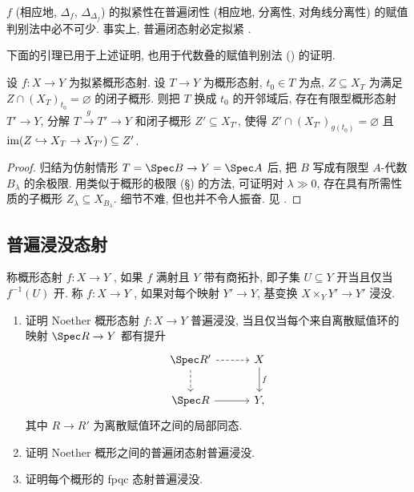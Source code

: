 \begin{remark}\label{src:A.4.7}
$f$ (相应地, $\Delta_f$, $\Delta_{\Delta_f}$) 的拟紧性在普遍闭性 (相应地, 分离性, 对角线分离性) 的赋值判别法中必不可少. 事实上, 普遍闭态射必定拟紧 \cite[Tag 04XU]{SP}.
\end{remark}
下面的引理已用于上述证明, 也用于代数叠的赋值判别法 () 的证明.
\begin{lemma}\label{src:A.4.8}
设 $f:X\to Y$ 为拟紧概形态射. 设 $T\to Y$ 为概形态射, $t_0\in T$ 为点, $Z\subseteq X_T$ 为满足 $Z\cap(X_T)_{t_0}=\varnothing$ 的闭子概形. 则把 $T$ 换成 $t_0$ 的开邻域后, 存在有限型概形态射 $T'\to Y$, 分解 $T\xrightarrow{g}T'\to Y$ 和闭子概形 $Z'\subseteq X_{T'}$, 使得 $Z'\cap(X_{T'})_{g(t_0)}=\varnothing$ 且 $\operatorname{im}(Z\hookrightarrow X_T\to X_{T'})\subseteq Z'$.
\end{lemma}
\begin{proof}
归结为仿射情形 $T=\Spec B\to Y=\Spec A$ 后, 把 $B$ 写成有限型 $A$-代数 $B_\lambda$ 的余极限. 用类似于概形的极限 (\S{}) 的方法, 可证明对 $\lambda\gg0$, 存在具有所需性质的子概形 $Z_\lambda\subseteq X_{B_\lambda}$. 细节不难, 但也并不令人振奋. 见 \cite[Tag 05BD]{SP}.
\end{proof}

\subsection{普遍浸没态射}\label{src:A.4.2-subsection}
称概形态射 $f:X\to Y$ , 如果 $f$ 满射且 $Y$ 带有商拓扑, 即子集 $U\subseteq Y$ 开当且仅当 $f^{-1}(U)$ 开. 称 $f:X\to Y$ , 如果对每个映射 $Y'\to Y$, 基变换 $X\times_Y Y'\to Y'$ 浸没.
\begin{exercise}\label{src:A.4.9}
\begin{enumerate}[(1)]
\item 证明 Noether 概形态射 $f:X\to Y$ 普遍浸没, 当且仅当每个来自离散赋值环的映射 $\Spec R\to Y$ 都有提升
\[
\begin{tikzcd}[column sep=3em,row sep=2em]
\Spec R'\arrow[r,dashed]\arrow[d,dashed]&X\arrow[d,"f"]\\
\Spec R\arrow[r]&Y,
\end{tikzcd}
\]
其中 $R\to R'$ 为离散赋值环之间的局部同态.
\item 证明 Noether 概形之间的普遍闭态射普遍浸没.
\item 证明每个概形的 fpqc 态射普遍浸没.
\end{enumerate}
\end{exercise}
